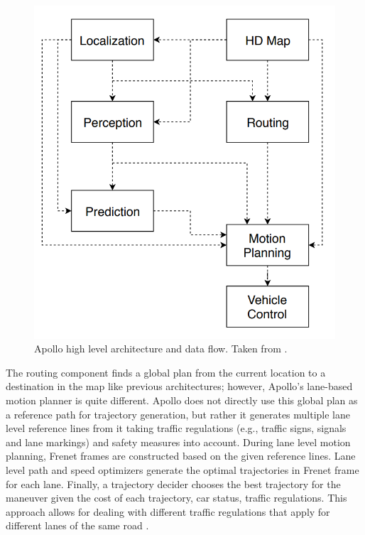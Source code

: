 \begin{figure}[h]
  \centering
  \includegraphics[width=.8\textwidth]{figures/apollo.png}
  \caption[Apollo high level architecture]{Apollo high level architecture and
    data flow. Taken from \cite{Fan2018BaiduAE}.}
  \label{figure:apollo}
\end{figure}

The routing component finds a global plan from the current location
to a destination in the map like previous architectures; however, Apollo's
lane-based motion planner is quite different. Apollo does not directly use
this global plan as a reference path for trajectory generation, but rather it
generates multiple lane level reference lines from it taking traffic
regulations (e.g., traffic signs, signals and lane markings) and safety
measures into account.  During lane level motion planning, Frenet frames are
constructed based on the given reference lines.  Lane level path and speed
optimizers generate the optimal trajectories in Frenet frame for each lane.
Finally, a trajectory decider chooses the best trajectory for the maneuver
given the cost of each trajectory, car status, traffic regulations.  This
approach allows for dealing with different traffic regulations that apply for
different lanes of the same road \cite{Fan2018BaiduAE}.

